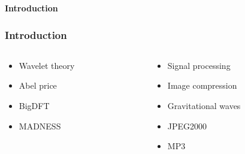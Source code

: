 \begin{frame}
    \centering
    \textbf{\Large{Introduction}}
\end{frame}

\begin{frame}
\frametitle{Introduction}
\centering

\begin{columns}
\begin{column}[b]{0.5\textwidth}
    \begin{itemize}
        \item   Wavelet theory
        \item   Abel price
        \item   BigDFT
        \item   MADNESS
    \end{itemize}
\end{column}
\begin{column}[b]{0.5\textwidth}
    \begin{itemize}
        \item   Signal processing
        \item   Image compression
        \item   Gravitational waves
        \item   JPEG2000
        \item   MP3
    \end{itemize}
\end{column}
\end{columns}
\end{frame}
